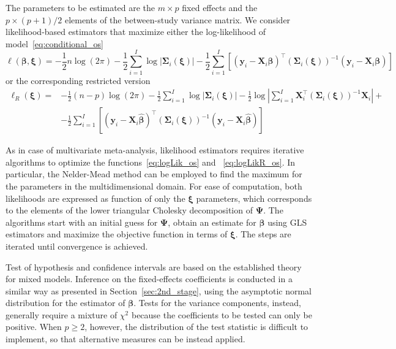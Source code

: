 \documentclass[11pt,a4paper,twoside,openany]{book}\usepackage{knitr}
\begin{document}
{{The parameters to be estimated are the $m\times p$ fixed effects and the $p \times (p+1)/2$ elements of the between-study variance matrix. We consider likelihood-based estimators that maximize either the log-likelihood of model~\ref{eq:conditional_os}
\begin{equation}
\ell \left( \boldsymbol{\beta}, \boldsymbol{\xi} \right) = 
 -\frac{1}{2} n \log(2\pi)  -\frac{1}{2} \sum_{i=1}^I \log | \boldsymbol{\Sigma}_i \left( \boldsymbol{\xi} \right) |  -\frac{1}{2}\sum_{i=1}^I \left[ \left( \mathbf{y}_i -  \mathbf{X}_i \boldsymbol{\beta} \right)^\top \left( \boldsymbol{\Sigma}_i \left( \boldsymbol{\xi} \right) \right)^{-1} \left( \mathbf{y}_i -  \mathbf{X}_i \boldsymbol{\beta} \right) \right]
\label{eq:logLik_os}
\end{equation}
\noindent or the corresponding restricted version
\begin{equation}
\begin{split}
\ell_R \left( \boldsymbol{\xi} \right) = & 
 -\frac{1}{2} (n - p) \log(2\pi)  - \frac{1}{2} \sum_{i=1}^I \log | \boldsymbol{\Sigma}_i \left( \boldsymbol{\xi} \right) |  - \frac{1}{2} \log \left| \sum_{i=1}^I \mathbf{X}_i^\top \left( \boldsymbol{\Sigma}_i \left( \boldsymbol{\xi} \right) \right)^{-1}  \mathbf{X}_i  \right| + \\
&-\frac{1}{2}\sum_{i=1}^I \left[ \left( \mathbf{y}_i -  \mathbf{X}_i \boldsymbol{\hat \beta} \right)^\top \left( \boldsymbol{\Sigma}_i \left( \boldsymbol{\xi} \right) \right)^{-1} \left( \mathbf{y}_i -  \mathbf{X}_i \boldsymbol{\hat \beta} \right) \right]
\end{split}
\label{eq:logLikR_os}
\end{equation}

\noindent As in case of multivariate meta-analysis, likelihood estimators requires iterative algorithms to optimize the functions~\ref{eq:logLik_os} and ~\ref{eq:logLikR_os}. 
In particular, the Nelder-Mead method can be employed to find the maximum for the parameters in the multidimensional domain. For ease of computation, both likelihoods are expressed as function of only the $\boldsymbol{\xi}$ parameters, which corresponds to the elements of the lower triangular Cholesky decomposition of $\boldsymbol{\Psi}$. The algorithms start with an initial guess for $\boldsymbol{\Psi}$, obtain an estimate for $\boldsymbol{\beta}$ using GLS estimators and maximize the objective function in terms of $\boldsymbol{\xi}$. The steps are iterated until convergence is achieved.

Test of hypothesis and confidence intervals are based on the established theory for mixed models. Inference on the fixed-effects coefficients is conducted in a similar way as presented in Section~\ref{sec:2nd_stage}, using the asymptotic normal distribution for the estimator of $\boldsymbol{\beta}$. Tests for the variance components, instead, generally require a mixture of $\chi^2$ because the coefficients to be tested can only be positive. When $p \ge 2$, however, the distribution of the test statistic is difficult to implement, so that alternative measures can be instead applied. 

}}
\end{document}
